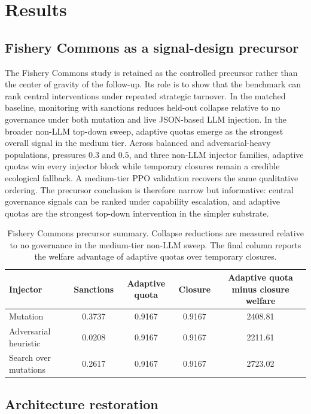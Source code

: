 \section{Results}

\subsection{Fishery Commons as a signal-design precursor}

The Fishery Commons study is retained as the controlled precursor rather than the center of gravity of the follow-up. Its role is to show that the benchmark can rank central interventions under repeated strategic turnover. In the matched baseline, monitoring with sanctions reduces held-out collapse relative to no governance under both mutation and live JSON-based LLM injection. In the broader non-LLM top-down sweep, adaptive quotas emerge as the strongest overall signal in the medium tier. Across balanced and adversarial-heavy populations, pressures \(0.3\) and \(0.5\), and three non-LLM injector families, adaptive quotas win every injector block while temporary closures remain a credible ecological fallback. A medium-tier PPO validation recovers the same qualitative ordering. The precursor conclusion is therefore narrow but informative: central governance signals can be ranked under capability escalation, and adaptive quotas are the strongest top-down intervention in the simpler substrate.

\begin{table}[t]
  \centering
  \caption{Fishery Commons precursor summary. Collapse reductions are measured relative to no governance in the medium-tier non-LLM sweep. The final column reports the welfare advantage of adaptive quotas over temporary closures.}
  \label{tab:fishery_precursor}
  \small
  \begin{tabular}{@{}lcccc@{}}
    \toprule
    Injector & Sanctions & Adaptive quota & Closure & Adaptive quota minus closure welfare \\
    \midrule
    Mutation & 0.3737 & 0.9167 & 0.9167 & 2408.81 \\
    Adversarial heuristic & 0.0208 & 0.9167 & 0.9167 & 2211.61 \\
    Search over mutations & 0.2617 & 0.9167 & 0.9167 & 2723.02 \\
    \bottomrule
  \end{tabular}
\end{table}

\subsection{Architecture restoration}

